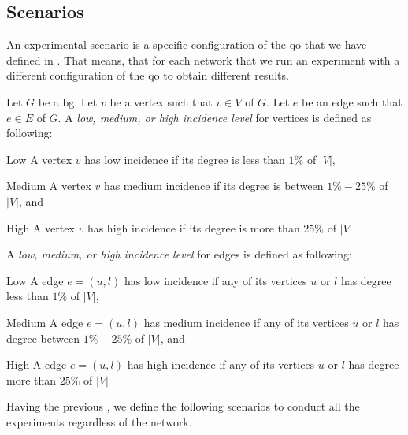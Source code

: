 \subsection{Scenarios}\label{sub:exp:exp-data-setup}
An experimental scenario is a specific configuration of the \acrlong{qo} that we have defined in . 
That means, that for each network that we run an experiment with a different configuration of the \acrshort{qo} to obtain different results.

\begin{definition}\label{def:exp:incidence}
Let $G$ be a \acrlong{bg}.
Let $v$ be a vertex such that $v \in V$ of $G$.
Let $e$ be an edge such that $e \in E$ of $G$.
A \emph{low, medium, or high incidence level} for vertices is defined as following:
\begin{inparaenum}
  \item[Low] A vertex $v$ has low incidence if its degree is less than $1\%$ of $|V|$,
  \item[Medium] A vertex $v$ has medium incidence if its degree is between $1\%-25\%$ of $|V|$, and
  \item[High] A vertex $v$ has high incidence if its degree is more than $25\%$ of $|V|$
\end{inparaenum}
A \emph{low, medium, or high incidence level} for edges is defined as following:
\begin{inparaenum}
  \item[Low] A edge $e = (u, l)$ has low incidence if any of its vertices $u$ or $l$ has degree less than $1\%$ of $|V|$,
  \item[Medium] A edge $e = (u, l)$ has medium incidence if any of its vertices $u$ or $l$ has degree between $1\%-25\%$ of $|V|$, and
  \item[High] A edge $e = (u, l)$ has high incidence if any of its vertices $u$ or $l$ has degree more than $25\%$ of $|V|$
\end{inparaenum}
\end{definition}


Having the previous , we define the following scenarios to conduct all the experiments regardless of the network.

